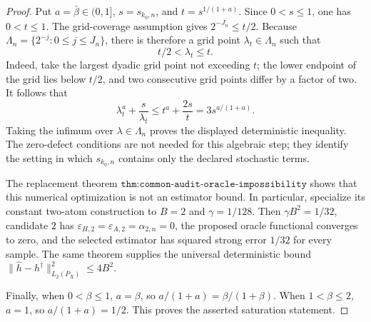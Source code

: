 \begin{proof}
Put \(a=\bar\beta\in(0,1]\), \(s=s_{k_0,n}\), and \(t=s^{1/(1+a)}\). Since \(0<s\le1\), one has \(0<t\le1\). The grid-coverage assumption gives \(2^{-J_n}\le t/2\). Because \(\Lambda_n=\{2^{-j}:0\le j\le J_n\}\), there is therefore a grid point \(\lambda_t\in\Lambda_n\) such that
\[
 t/2<\lambda_t\le t.
\]
Indeed, take the largest dyadic grid point not exceeding \(t\); the lower endpoint of the grid lies below \(t/2\), and two consecutive grid points differ by a factor of two. It follows that
\[
 \lambda_t^a+\frac{s}{\lambda_t}
 \le t^a+\frac{2s}{t}
 =3s^{a/(1+a)}.
\]
Taking the infimum over \(\lambda\in\Lambda_n\) proves the displayed deterministic inequality. The zero-defect conditions are not needed for this algebraic step; they identify the setting in which \(s_{k_0,n}\) contains only the declared stochastic terms.

The replacement theorem \(\texttt{thm:common-audit-oracle-impossibility}\) shows that this numerical optimization is not an estimator bound. In particular, specialize its constant two-atom construction to \(B=2\) and \(\gamma=1/128\). Then \(\gamma B^2=1/32\), candidate \(2\) has \(\varepsilon_{H,2}=\varepsilon_{A,2}=\alpha_{2,n}=0\), the proposed oracle functional converges to zero, and the selected estimator has squared strong error \(1/32\) for every sample. The same theorem supplies the universal deterministic bound \(\|\widehat h-h^\dagger\|_{L_2(P_X)}^2\le4B^2\).

Finally, when \(0<\beta\le1\), \(a=\beta\), so \(a/(1+a)=\beta/(1+\beta)\). When \(1<\beta\le2\), \(a=1\), so \(a/(1+a)=1/2\). This proves the asserted saturation statement.
\end{proof}